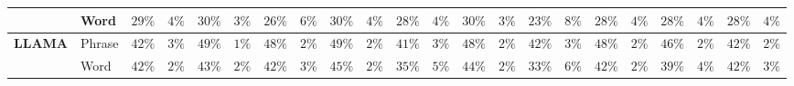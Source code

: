 \begin{table}[t]
{\begin{tabular}{ll|cc|cc|cc|cc|cc|cc|cc|cc|cc|cc}
 & Word & \cellcolor{red!29}$29\%$ & \cellcolor{orange!5}$4\%$ & \cellcolor{red!30}$30\%$ & \cellcolor{orange!5}$3\%$ & \cellcolor{red!26}$26\%$ & \cellcolor{orange!6}$6\%$ & \cellcolor{red!30}$30\%$ & \cellcolor{orange!5}$4\%$ & \cellcolor{red!28}$28\%$ & \cellcolor{orange!5}$4\%$ & \cellcolor{red!30}$30\%$ & \cellcolor{orange!5}$3\%$ & \cellcolor{red!23}$23\%$ & \cellcolor{orange!8}$8\%$ & \cellcolor{red!28}$28\%$ & \cellcolor{orange!5}$4\%$ & \cellcolor{red!28}$28\%$ & \cellcolor{orange!5}$4\%$ & \cellcolor{red!28}$28\%$ & \cellcolor{orange!5}$4\%$ \\
\hline
\multirow{2}{*}{\textbf{LLAMA}} & Phrase & \cellcolor{red!42}$42\%$ & \cellcolor{orange!5}$3\%$ & \cellcolor{red!49}$49\%$ & \cellcolor{orange!5}$1\%$ & \cellcolor{red!48}$48\%$ & \cellcolor{orange!5}$2\%$ & \cellcolor{red!49}$49\%$ & \cellcolor{orange!5}$2\%$ & \cellcolor{red!41}$41\%$ & \cellcolor{orange!5}$3\%$ & \cellcolor{red!48}$48\%$ & \cellcolor{orange!5}$2\%$ & \cellcolor{red!42}$42\%$ & \cellcolor{orange!5}$3\%$ & \cellcolor{red!48}$48\%$ & \cellcolor{orange!5}$2\%$ & \cellcolor{red!46}$46\%$ & \cellcolor{orange!5}$2\%$ & \cellcolor{red!42}$42\%$ & \cellcolor{orange!5}$2\%$ \\
 & Word & \cellcolor{red!42}$42\%$ & \cellcolor{orange!5}$2\%$ & \cellcolor{red!43}$43\%$ & \cellcolor{orange!5}$2\%$ & \cellcolor{red!42}$42\%$ & \cellcolor{orange!5}$3\%$ & \cellcolor{red!45}$45\%$ & \cellcolor{orange!5}$2\%$ & \cellcolor{red!35}$35\%$ & \cellcolor{orange!5}$5\%$ & \cellcolor{red!44}$44\%$ & \cellcolor{orange!5}$2\%$ & \cellcolor{red!33}$33\%$ & \cellcolor{orange!6}$6\%$ & \cellcolor{red!42}$42\%$ & \cellcolor{orange!5}$2\%$ & \cellcolor{red!39}$39\%$ & \cellcolor{orange!5}$4\%$ & \cellcolor{red!42}$42\%$ & \cellcolor{orange!5}$3\%$ \\
\hline
\end{tabular}%
}
\end{table}